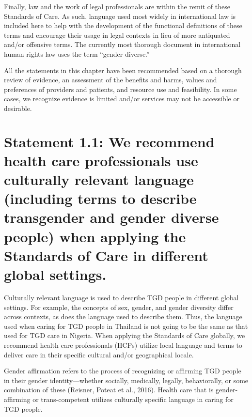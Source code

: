 \documentclass[
]{book}
\begin{document}
Finally, law and the work of legal professionals
are within the remit of these Standards of Care.
As such, language used most widely in international law is included here to help with the development of the functional definitions of these terms
and encourage their usage in legal contexts in lieu
of more antiquated and/or offensive terms. The
currently most thorough document in international
human rights law uses the term ``gender diverse.''

All the statements in this chapter have been
recommended based on a thorough review of
evidence, an assessment of the benefits and
harms, values and preferences of providers and
patients, and resource use and feasibility. In some
cases, we recognize evidence is limited and/or
services may not be accessible or desirable.

\hypertarget{statement-1.1-we-recommend-health-care-professionals-use-culturally-relevant-language-including-terms-to-describe-transgender-and-gender-diverse-people-when-applying-the-standards-of-care-in-different-global-settings.}{%
\section*{Statement 1.1: We recommend health care professionals use culturally relevant language (including terms to describe transgender and gender diverse people) when applying the Standards of Care in different global settings.}\label{statement-1.1-we-recommend-health-care-professionals-use-culturally-relevant-language-including-terms-to-describe-transgender-and-gender-diverse-people-when-applying-the-standards-of-care-in-different-global-settings.}}

Culturally relevant language is used to describe
TGD people in different global settings. For example, the concepts of sex, gender, and gender diversity
differ across contexts, as does the language used to
describe them. Thus, the language used when caring
for TGD people in Thailand is not going to be the
same as that used for TGD care in Nigeria. When
applying the Standards of Care globally, we recommend health care professionals (HCPs) utilize local
language and terms to deliver care in their specific
cultural and/or geographical locale.

Gender affirmation refers to the process of recognizing or affirming TGD people in their gender
identity---whether socially, medically, legally, behaviorally, or some combination of these (Reisner,
Poteat et al., 2016). Health care that is
gender-affirming or trans-competent utilizes culturally specific language in caring for TGD people.
\end{document}
